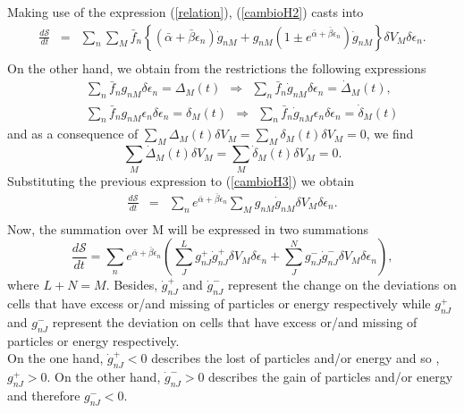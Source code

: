 \documentclass{article}
\newcommand{\de}{\delta}
\newcommand{\Ss}{\mathcal{S}}
\begin{document}
Making use of the expression (\ref{relation}),
(\ref{cambioH2}) casts into
\begin{eqnarray}
    \frac{d\Ss}{dt}&=&\sum_n \sum_M \bar{f}_n\left \{ (\bar{\alpha}+\bar{\beta}{\epsilon}_n)\dot{g}_{nM}+ g_{nM}\left(1\pm e^{\bar{\alpha}+\bar{\beta}{\epsilon}_n}\right)\dot{g}_{nM} \right \} \de V_M \delta \epsilon_n. \nonumber \\
    \label{cambioH3}
\end{eqnarray}{}
On the other hand, we obtain from the restrictions the following expressions
\begin{eqnarray}
    &&\sum_n \bar{f}_n g_{nM} \delta \epsilon_n=\Delta_M(t) \ \  \Rightarrow \ \  \sum_n \bar{f}_n \dot{g}_{nM} \delta \epsilon_n=\dot{\Delta}_M(t), \nonumber \\
    &&\sum_n  \bar{f}_n g_{nM}\epsilon_n \delta \epsilon_n=\delta_M(t) \ \  \Rightarrow \ \  \sum_n \bar{f}_n \dot{g}_{nM}\epsilon_n \delta \epsilon_n=\dot{\delta}_M(t)
\end{eqnarray}{}
and as a consequence of $\sum_M \Delta_M(t) \de V_M  =\sum_M \delta_M(t) \de V_M =0$, we find
\begin{equation}
    \sum_M \dot{\Delta}_M(t) \de V_M =\sum_M \dot{\delta}_{M}(t) \de V_M=0.
\end{equation}{}
Substituting the previous expression to (\ref{cambioH3}) we obtain
\begin{eqnarray}
   \frac{d\Ss}{dt}&=&  \sum_n e^{\bar{\alpha}+\bar{\beta}\epsilon_n}\sum_M  g_{nM}\dot{g}_{nM} \de V_M\delta \epsilon_n. \nonumber \\ \label{cambioH4}
\end{eqnarray}{}
Now, the summation over M will be expressed in two summations
\begin{equation}
    \frac{d\Ss}{dt}=\sum_n  e^{\bar{\alpha}+\bar{\beta}\epsilon_n}\left(\sum_J ^{L} g^{+}_{nJ}\dot{g}^{+}_{nJ}\de V_M \delta \epsilon_n+\sum^{N}_J  g^{-}_{nJ}\dot{g}^{-}_{nJ} \de V_M\delta \epsilon_n \right), \label{cambioH5}
\end{equation}{}
where $L+N=M$. Besides, $\dot{g}^{+}_{nJ}$ and $\dot{g}^{-}_{nJ}$  represent the change on the deviations on cells that have excess or/and missing of particles or energy respectively while $g^{+}_{nJ}$ and $g^{-}_{nJ}$ represent the deviation on cells that have excess or/and missing of particles or energy respectively.\\
On the one hand, $\dot{g}^{+}_{nJ}<0$ describes the lost of particles and/or energy and so , $g^{+}_{nJ}>0$. On the other hand, $\dot{g}^{-}_{nJ}>0$ describes the gain of particles and/or energy and therefore $g^{-}_{nJ}<0$. \\
\end{document}
